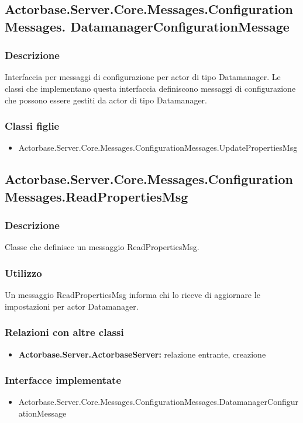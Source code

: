 \documentclass[a4paper]{article}
\begin{document}
			\subsection{Actorbase.Server.Core.Messages.ConfigurationMessages.
			DatamanagerConfigurationMessage}
			\subsubsection{Descrizione}
				Interfaccia per messaggi di configurazione per actor di tipo Datamanager. 
				Le classi che implementano questa interfaccia definiscono messaggi di configurazione che possono essere gestiti da actor di tipo Datamanager.
			\subsubsection{Classi figlie}
			\begin{itemize}
				\item Actorbase.Server.Core.Messages.ConfigurationMessages.UpdatePropertiesMsg
			\end{itemize}

			\subsection{Actorbase.Server.Core.Messages.ConfigurationMessages.ReadPropertiesMsg}
			\subsubsection{Descrizione}
				Classe che definisce un messaggio ReadPropertiesMsg.
			\subsubsection{Utilizzo}
				Un messaggio ReadPropertiesMsg informa chi lo riceve di aggiornare le impostazioni per actor Datamanager.
			\subsubsection{Relazioni con altre classi}
			\begin{itemize}
				\item \textbf{Actorbase.Server.ActorbaseServer:} relazione entrante, creazione
			\end{itemize}
			\subsubsection{Interfacce implementate}
			\begin{itemize}
				\item Actorbase.Server.Core.Messages.ConfigurationMessages.DatamanagerConfigurationMessage
			\end{itemize}
			
\end{document}
